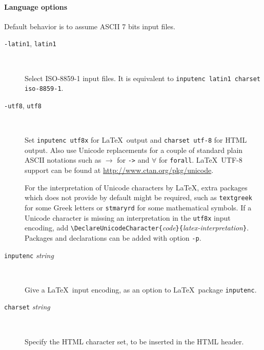 \paragraph{Language options}

Default behavior is to assume ASCII 7 bits input files.

\begin{description}

\item[\texttt{-latin1}, \texttt{\mm{}latin1}] ~\par

  Select ISO-8859-1 input files. It is equivalent to
  \texttt{\mm{}inputenc latin1 \mm{}charset iso-8859-1}.

\item[\texttt{-utf8}, \texttt{\mm{}utf8}] ~\par

  Set \texttt{\mm{}inputenc utf8x} for \LaTeX\ output and
  \texttt{\mm{}charset utf-8} for HTML output. Also use Unicode
  replacements for a couple of standard plain ASCII notations such
  as $\rightarrow$ for \texttt{->} and $\forall$ for
  \texttt{forall}. \LaTeX\ UTF-8 support can be found at
  \url{http://www.ctan.org/pkg/unicode}.

  For the interpretation of Unicode characters by \LaTeX, extra
  packages which {\coqdoc} does not provide by default might be
  required, such as \texttt{textgreek} for some Greek letters or
  \texttt{stmaryrd} for some mathematical symbols. If a Unicode
  character is missing an interpretation in the \texttt{utf8x} input
  encoding, add
  \verb=\DeclareUnicodeCharacter{=\textit{code}\verb=}{=\textit{latex-interpretation}\verb=}=. Packages
  and declarations can be added with option \texttt{-p}.

\item[\texttt{\mm{}inputenc} \textit{string}] ~\par

  Give a \LaTeX\ input encoding, as an option to \LaTeX\ package
  \texttt{inputenc}.

\item[\texttt{\mm{}charset} \textit{string}] ~\par

  Specify the HTML character set, to be inserted in the HTML header.

\end{description}



